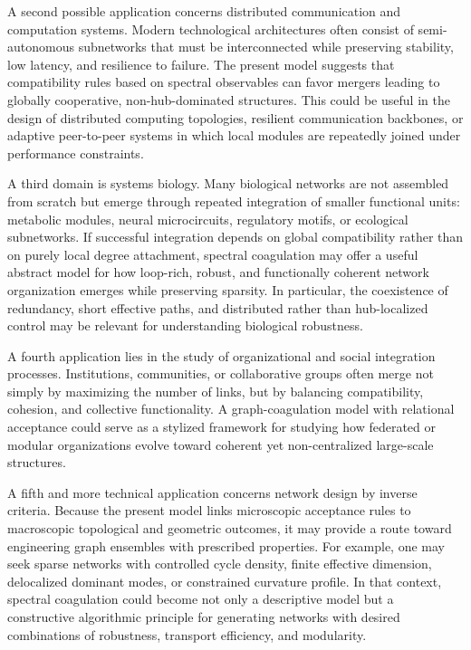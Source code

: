 \documentclass[11pt]{article}
\begin{document}
A second possible application concerns distributed communication and computation systems.
Modern technological architectures often consist of semi-autonomous subnetworks that must be interconnected while preserving stability, low latency, and resilience to failure.
The present model suggests that compatibility rules based on spectral observables can favor mergers leading to globally cooperative, non-hub-dominated structures.
This could be useful in the design of distributed computing topologies, resilient communication backbones, or adaptive peer-to-peer systems in which local modules are repeatedly joined under performance constraints.

A third domain is systems biology.
Many biological networks are not assembled from scratch but emerge through repeated integration of smaller functional units:
metabolic modules, neural microcircuits, regulatory motifs, or ecological subnetworks.
If successful integration depends on global compatibility rather than on purely local degree attachment, spectral coagulation may offer a useful abstract model for how loop-rich, robust, and functionally coherent network organization emerges while preserving sparsity.
In particular, the coexistence of redundancy, short effective paths, and distributed rather than hub-localized control may be relevant for understanding biological robustness.

A fourth application lies in the study of organizational and social integration processes.
Institutions, communities, or collaborative groups often merge not simply by maximizing the number of links, but by balancing compatibility, cohesion, and collective functionality.
A graph-coagulation model with relational acceptance could serve as a stylized framework for studying how federated or modular organizations evolve toward coherent yet non-centralized large-scale structures.

A fifth and more technical application concerns network design by inverse criteria.
Because the present model links microscopic acceptance rules to macroscopic topological and geometric outcomes, it may provide a route toward engineering graph ensembles with prescribed properties.
For example, one may seek sparse networks with controlled cycle density, finite effective dimension, delocalized dominant modes, or constrained curvature profile.
In that context, spectral coagulation could become not only a descriptive model but a constructive algorithmic principle for generating networks with desired combinations of robustness, transport efficiency, and modularity.
\end{document}
